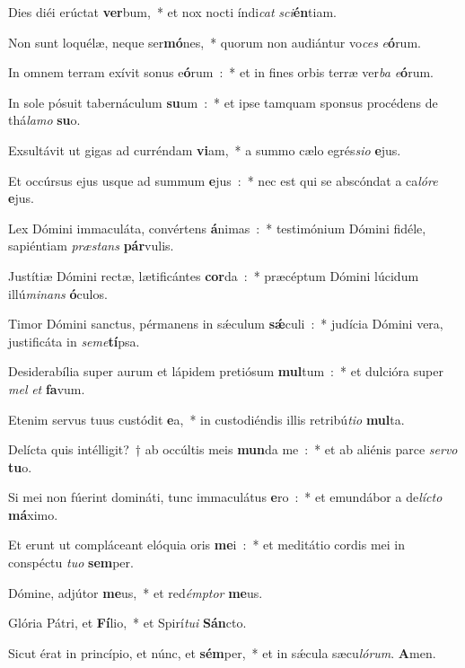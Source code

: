 \item Dies diéi erúctat \textbf{ver}bum,~* et nox nocti índi\emph{cat} \emph{sci}\textbf{én}tiam.
\item Non sunt loquélæ, neque ser\textbf{mó}nes,~* quorum non audiántur vo\emph{ces} \emph{e}\textbf{ó}rum.
\item In omnem terram exívit sonus e\textbf{ó}rum~:~* et in fines orbis terræ ver\emph{ba} \emph{e}\textbf{ó}rum.
\item In sole pósuit tabernáculum \textbf{su}um~:~* et ipse tamquam sponsus procédens de thá\emph{la}\emph{mo} \textbf{su}o.
\item Exsultávit ut gigas ad curréndam \textbf{vi}am,~* a summo cælo egrés\emph{si}\emph{o} \textbf{e}jus.
\item Et occúrsus ejus usque ad summum \textbf{e}jus~:~* nec est qui se abscóndat a ca\emph{ló}\emph{re} \textbf{e}jus.
\item Lex Dómini immaculáta, convértens \textbf{á}nimas~:~* testimónium Dómini fidéle, sapiéntiam \emph{præ}\emph{stans} \textbf{pár}vulis.
\item Justítiæ Dómini rectæ, lætificántes \textbf{cor}da~:~* præcéptum Dómini lúcidum illú\emph{mi}\emph{nans} \textbf{ó}culos.
\item Timor Dómini sanctus, pérmanens in sǽculum \textbf{sǽ}culi~:~* judícia Dómini vera, justificáta in \emph{se}\emph{me}\textbf{tí}psa.
\item Desiderabília super aurum et lápidem pretiósum \textbf{mul}tum~:~* et dulcióra super \emph{mel} \emph{et} \textbf{fa}vum.
\item Etenim servus tuus custódit \textbf{e}a,~* in custodiéndis illis retribú\emph{ti}\emph{o} \textbf{mul}ta.
\item Delícta quis intélligit?~† ab occúltis meis \textbf{mun}da me~:~* et ab aliénis parce \emph{ser}\emph{vo} \textbf{tu}o.
\item Si mei non fúerint domináti, tunc immaculátus \textbf{e}ro~:~* et emundábor a de\emph{lí}\emph{cto} \textbf{má}ximo.
\item Et erunt ut compláceant elóquia oris \textbf{me}i~:~* et meditátio cordis mei in conspéctu \emph{tu}\emph{o} \textbf{sem}per.
\item Dómine, adjútor \textbf{me}us,~* et red\emph{ém}\emph{ptor} \textbf{me}us.
\item Glória Pátri, et \textbf{Fí}lio,~* et Spirí\emph{tu}\emph{i} \textbf{Sán}cto.
\item Sicut érat in princípio, et núnc, et \textbf{sém}per,~* et in sǽcula sæcu\emph{ló}\emph{rum}. \textbf{A}men.
